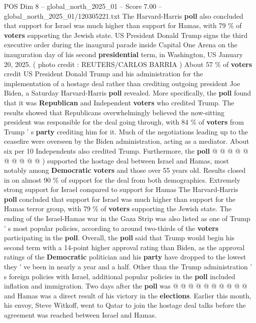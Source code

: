 \begin{textsample}{POS Dim 8 – global\_north\_2025\_01 – Score 7.00 – global\_north\_2025\_01/120305221.txt}  \label{ex:f8_pos_293}
The Harvard-Harris \textbf{poll} also concluded that support for Israel was much higher than support for Hamas, with 79 \% of \textbf{voters} supporting the Jewish state.
US President Donald Trump signs the third executive order during the inaugural parade inside Capital One Arena on the inauguration day of his second \textbf{presidential} term, in Washington, US January 20, 2025. ( photo credit : REUTERS/CARLOS BARRIA ) About 57 \% of \textbf{voters} credit US President Donald Trump and his administration for the implementation of a hostage deal rather than crediting outgoing president Joe Biden, a Saturday Harvard-Harris \textbf{poll} revealed.
More specifically, the \textbf{poll} found that it was \textbf{Republican} and Independent \textbf{voters} who credited Trump.
The results showed that Republicans overwhelmingly believed the now-sitting president was responsible for the deal going through, with 84 \% of \textbf{voters} from Trump ' s \textbf{party} crediting him for it.
Much of the negotiations leading up to the ceasefire were overseen by the Biden administration, acting as a mediator.
About six per 10 Independents also credited Trump.
Furthermore, the \textbf{poll} @ @ @ @ @ @ @ @ @ @ ) supported the hostage deal between Israel and Hamas, most notably among \textbf{Democratic} \textbf{voters} and those over 55 years old.
Results closed in on almost 90 \% of support for the deal from both demographics.
Extremely strong support for Israel compared to support for Hamas The Harvard-Harris \textbf{poll} concluded that support for Israel was much higher than support for the Hamas terror group, with 79 \% of \textbf{voters} supporting the Jewish state.
The ending of the Israel-Hamas war in the Gaza Strip was also listed as one of Trump ' s most popular policies, according to around two-thirds of the \textbf{voters} participating in the \textbf{poll}.
Overall, the \textbf{poll} said that Trump would begin his second term with a 14-point higher approval rating than Biden, as the approval ratings of the \textbf{Democratic} politician and his \textbf{party} have dropped to the lowest they ' ve been in nearly a year and a half.
Other than the Trump administration ' s foreign policies with Israel, additional popular policies in the \textbf{poll} included inflation and immigration.
Two days after the \textbf{poll} was @ @ @ @ @ @ @ @ @ @ and Hamas was a direct result of his victory in the \textbf{elections}.
Earlier this month, his envoy, Steve Witkoff, went to Qatar to join the hostage deal talks before the agreement was reached between Israel and Hamas.

\end{textsample}
